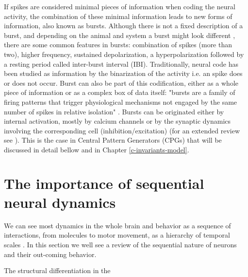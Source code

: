 If spikes are considered minimal pieces of information when coding the neural activity, the combination of these minimal information leads to new forms of information, also known as bursts. Although there is not a fixed description of a burst, and depending on the animal and system a burst might look different \parencite{russell_bursting_1978,palmu_detection_2010,lundqvist_gamma_2016}, there are some common features in bursts: combination of spikes (more than two), higher frequency, sustained depolarization, a hyperpolarization followed by a resting period called inter-burst interval (IBI). Traditionally, neural code has been studied as information by the binarization of the activity i.e. an spike does or does not occur. Burst can also be part of this codification, either as a whole piece of information or as a complex box of data itself: "bursts are a family of firing patterns that trigger physiological mechanisms not engaged by the same number of spikes in relative isolation" \parencite{friedenberger_silences_2023}. Bursts can be originated either by internal activation, mostly by calcium channels or by the synaptic dynamics involving the corresponding cell (inhibition/excitation) (for an extended review see \parencite{friedenberger_silences_2023}). This is the case in Central Pattern Generators (CPGs) \parencite{Katz,steuer_central_2018} that will be discussed in detail bellow and in Chapter \ref{c-invariants-model}.

\section{The importance of sequential neural dynamics}
We can see most dynamics in the whole brain and behavior as a sequence of interactions, from molecules to motor movement, as a hierarchy of temporal scales \parencite{kiebel_hierarchy_2008}. In this section we well see a review of the sequential nature of neurons and their out-coming behavior.

The structural differentiation in the 



